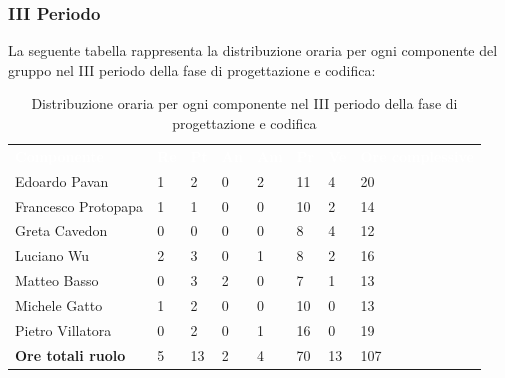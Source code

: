 \subsubsection{III Periodo}
La seguente tabella rappresenta la distribuzione oraria per ogni componente del gruppo nel III periodo della fase di progettazione e codifica:
\begin{table}[H]
\begin{center}
\renewcommand{\arraystretch}{1.25}
\begin{tabular}{ m{}<{\centering}  m{}<{\centering} m{}<{\centering} m{}<{\centering}  m{}<{\centering}  m{}<{\centering}  m{}<{\centering}  m{}<{\centering}   }
	\rowcolor{darkblue}
	\textcolor{white}{\textbf{Componente}} &\textcolor{white}{\textbf{Re}}&\textcolor{white}{\textbf{Pt}}&\textcolor{white}{\textbf{An}}&\textcolor{white}{\textbf{Am}}&\textcolor{white}{\textbf{Pr}}&\textcolor{white}{\textbf{Ve}}&\textcolor{white}{\textbf{Ore complessive}}\\ 
	Edoardo Pavan & 1 & 2 & 0 & 2 & 11 & 4 & 20 \\	
	
	Francesco Protopapa & 1 & 1 & 0 & 0 & 10 & 2 & 14 \\

	Greta Cavedon & 0 & 0 & 0 & 0 & 8 & 4 & 12 \\
	
	Luciano Wu & 2 & 3 & 0 & 1 & 8 & 2 & 16 \\
	
	Matteo Basso & 0 & 3 & 2 & 0 & 7 & 1 & 13 \\
	
	Michele Gatto & 1  & 2 & 0 & 0 & 10 & 0 & 13 \\
	
	Pietro Villatora & 0 & 2 & 0 & 1 & 16 & 0 & 19 \\
	
	\textbf{Ore totali ruolo} & 5 & 13 & 2 & 4 & 70 & 13 & 107 \\

\end{tabular}
\caption{Distribuzione oraria per ogni componente nel III periodo della fase di progettazione e codifica}
\end{center}
\end{table}

